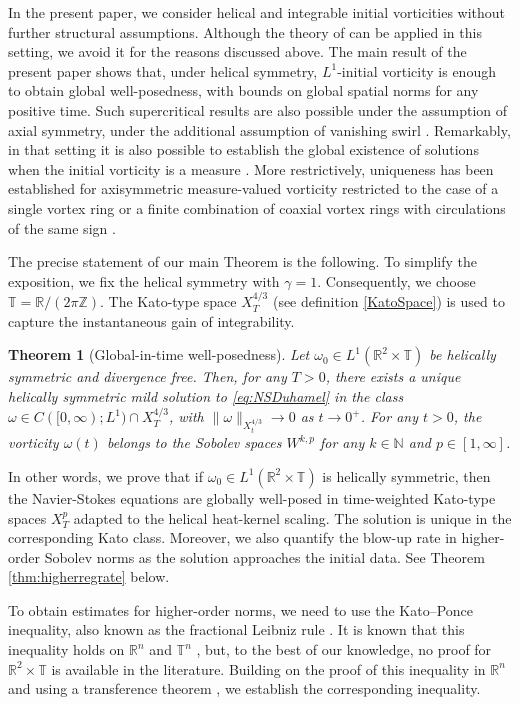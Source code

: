 \documentclass[11pt,a4paper]{article}
\newcommand{\w}{\omega}
\newcommand{\N}{\mathbb{N}}
\newcommand{\Z}{\mathbb{Z}}
\newcommand{\R}{\mathbb{R}}
\newcommand{\T}{\mathbb{T}}
\newtheorem{thm}{Theorem}[section]
\begin{document}
In the present paper, we consider helical and integrable initial vorticities
without further structural assumptions. Although the theory of \cite{GH-T2023} can be
applied in this setting, we avoid it for the reasons discussed above. 
The main result of the present paper shows that, under helical symmetry, $L^1$-initial vorticity is enough to obtain global well-posedness, with bounds on global spatial norms for any positive time. Such supercritical results are also possible under the assumption of axial symmetry, under the additional assumption of vanishing swirl \cite{GallaySverak2015}. Remarkably, in that setting it is also possible to establish the global existence of solutions when the initial vorticity is a measure \cite{FengSverak15}. More restrictively, uniqueness has been established for axisymmetric measure-valued vorticity restricted to the case of a single vortex ring \cite{GallaySverak19} or a finite combination of coaxial vortex rings with circulations of the same sign \cite{LevyLiu2018}.

The precise statement of our main Theorem is the following. To simplify the exposition, we fix the helical symmetry with $\gamma=1$. Consequently, we choose $\T=\R/(2\pi\Z)$. The Kato-type space $X_T^{4/3}$ (see definition \ref{KatoSpace}) is used to  capture the instantaneous gain of integrability.  

\begin{thm}[Global-in-time well-posedness]\label{thm:globalmain}
Let $\w_0\in L^1(\R^2\times\T)$ be helically symmetric and divergence free. Then, for any $T>0$, there exists a unique helically symmetric mild solution to \eqref{eq:NSDuhamel} in the class $\w \in C([0,\infty);L^1)\cap X^{4/3}_T$, with $\|\w\|_{X^{4/3}_t}\to 0$ as $t\to0^+ $. For any $t>0$, the vorticity $\w(t)$ belongs to the Sobolev spaces $W^{k,p}$ for any $k\in \N$ and $p\in [1,\infty]$.
\end{thm}

In other words, we prove that if
$
\omega_0\in L^1(\mathbb R^2\times\mathbb T)
$
is helically symmetric, then the Navier-Stokes equations are globally
well-posed in time-weighted Kato-type spaces $X^p_T$ adapted to the helical
heat-kernel scaling. 
The solution is unique in the corresponding Kato class. Moreover, we also quantify the blow-up rate in higher-order Sobolev norms as the solution approaches the initial data. See Theorem \ref{thm:higherregrate} below.

To obtain estimates for higher-order norms, we need to use the Kato–Ponce inequality, also known as the fractional Leibniz rule \cite{KatoPonce1vez}. It is known that this inequality holds on $\R^n$ \cite{GrafakosOh2014} and $\T^n$ \cite{BenyiOhZhao2025}, but, to the best of our knowledge, no proof for $\R^2\times \T$ is available in the literature. Building on the proof of this inequality in $\R^n$ \cite{GrafakosOh2014} and using a transference theorem \cite{RodriguezLopez2013}, we establish the corresponding inequality.
\end{document}
